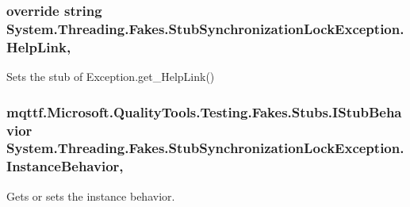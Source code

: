 \hypertarget{class_system_1_1_threading_1_1_fakes_1_1_stub_synchronization_lock_exception_adcb3fe5ac1dd1636abfa17c160c64f3c}{
\subsubsection[{Help\-Link}]{\setlength{\rightskip}{0pt plus 5cm}override string System.\-Threading.\-Fakes.\-Stub\-Synchronization\-Lock\-Exception.\-Help\-Link\hspace{0.3cm}{\ttfamily [get]}, {\ttfamily [set]}}}\label{class_system_1_1_threading_1_1_fakes_1_1_stub_synchronization_lock_exception_adcb3fe5ac1dd1636abfa17c160c64f3c}


Sets the stub of Exception.\-get\-\_\-\-Help\-Link()

\hypertarget{class_system_1_1_threading_1_1_fakes_1_1_stub_synchronization_lock_exception_afae3c6de1d4541edf6b78712be165cfe}{
\subsubsection[{Instance\-Behavior}]{\setlength{\rightskip}{0pt plus 5cm}mqttf.\-Microsoft.\-Quality\-Tools.\-Testing.\-Fakes.\-Stubs.\-I\-Stub\-Behavior System.\-Threading.\-Fakes.\-Stub\-Synchronization\-Lock\-Exception.\-Instance\-Behavior\hspace{0.3cm}{\ttfamily [get]}, {\ttfamily [set]}}}\label{class_system_1_1_threading_1_1_fakes_1_1_stub_synchronization_lock_exception_afae3c6de1d4541edf6b78712be165cfe}


Gets or sets the instance behavior.


